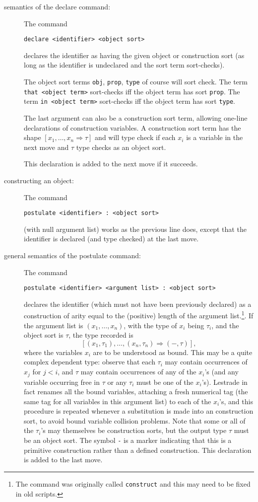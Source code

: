 \documentclass[12pt]{article}
\begin{document}
\begin{description}
\item[semantics of the declare command:]  The command \begin{center}{\tt declare <identifier> <object sort>}\end{center}  declares the identifier as having the given object or construction sort (as long as the identifier is undeclared and the sort term sort-checks).

The object sort terms {\tt obj}, {\tt prop}, {\tt type} of course will sort check.  The term {\tt that <object term>} sort-checks iff the object term has sort {\tt prop}.   The term {\tt in <object term>} sort-checks iff the object term has sort {\tt type}.   

The last argument can also be a construction sort term, allowing one-line declarations of construction variables.  A construction sort term has the shape
$[x_1,\ldots,x_n \Rightarrow \tau]$ and will type check if each $x_i$ is a variable in the next move and $\tau$ type checks as an object sort.

This declaration is added to the next move if it succeeds.

\item[constructing an object:]  The command \begin{center}{\tt postulate <identifier> : <object sort>}\end{center} (with null argument list) works as the previous line does, except that the identifier is declared (and type checked) at the last move.

\item[general semantics of the postulate command:]  The command \begin{center}{\tt postulate <identifier> <argument list> : <object sort>}\end{center} declares the identifier (which must not have been previously declared) as a construction of arity equal to the (positive) length of the argument list.\footnote{The command was originally called {\tt construct} and this may need to be fixed in old scripts.}.  If the argument list
is $(x_1,\ldots,x_n)$, with the type of $x_i$ being $\tau_i$,  and the object sort is $\tau$,  the type recorded is $$[(x_1,\tau_1),\ldots,(x_n,\tau_n) \Rightarrow (-,\tau)],$$ where
the variables $x_i$ are to be understood as bound.   This may be a quite complex dependent type:  observe that each $\tau_i$ may contain occurrences of $x_j$ for $j<i$,
and $\tau$ may contain occurrences of any of the $x_i$'s (and any variable occurring free in $\tau$ or any $\tau_i$ must be one of the $x_i$'s).  Lestrade in fact renames all the bound variables, attaching a fresh numerical tag (the same tag for all variables in this argument list) to each of the $x_i$'s, and this procedure is repeated whenever a substitution is made into an construction sort, to avoid bound variable collision problems.
Note that some or all of the $\tau_i$'s may themselves be construction sorts, but the output type $\tau$ must be an object sort.  The symbol {\tt -} is a marker indicating that this is a primitive construction rather than a defined construction.  This declaration is added to the last move.


\end{description}
\end{document}
